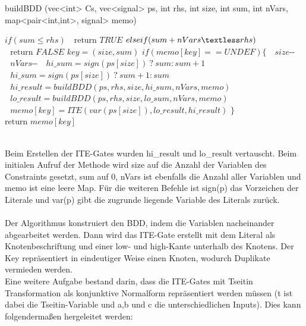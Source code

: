 \documentclass[a4,abstract=on]{scrartcl}
\begin{document}
\begin{algorithm}
\caption{buildBDD (vec<int> Cs, vec<signal> ps, int rhs, int size, int sum, int nVars, map<pair<int,int>, signal> memo)}
\label{alg:buildBDD}
\begin{algorithmic}

\State $\text{}if (sum \leq rhs)$
\State $\text{~~return } TRUE$
\State $\text{}else if (sum + nVars \textless rhs)$
\State $\text{~~return } FALSE$
\State $\text{} key = (size, sum)$
\State $\text{}if (memo[key] == UNDEF) \{$
\State $\text{~~} size\text{-{}-}$
\State $\text{~~} nVars \text{-{}-}$
\State $\text{~~} hi\_sum = sign(ps[size]) {~} ? {~} sum : sum + 1$
\State $\text{~~} hi\_sum = sign(ps[size]) {~} ? {~} sum + 1 : sum$
\State $\text{~~} hi\_result = buildBDD(ps , rhs, size, hi\_sum, nVars, memo)$
\State $\text{~~} lo\_result = buildBDD(ps , rhs, size, lo\_sum, nVars, memo)$
\State $\text{~~} memo[key] = ITE(var(ps[size]), lo\_result, hi\_result)$
\State $\text{} \}$
\State $\text{return }memo[key]$
\end{algorithmic}
\end{algorithm}
\ \\
Beim Erstellen der ITE-Gates wurden hi\_result und lo\_result vertauscht. Beim initialen Aufruf der Methode wird size auf die Anzahl der Variablen des Constraints gesetzt, sum auf $0$, nVars ist ebenfalls die Anzahl aller Variablen und memo ist eine leere Map. Für die weiteren Befehle ist sign(p) das Vorzeichen der Literale und var(p) gibt die zugrunde liegende Variable des Literals zurück.\\
\ \\
Der Algorithmus konstruiert den BDD, indem die Variablen nacheinander abgearbeitet werden. Dann wird das ITE-Gate erstellt mit dem Literal als Knotenbeschriftung und einer low- und high-Kante unterhalb des Knotens. Der Key repräsentiert in eindeutiger Weise einen Knoten, wodurch Duplikate vermieden werden.\\
Eine weitere Aufgabe bestand darin, dass die ITE-Gates mit Tseitin Transformation als konjunktive Normalform repräsentiert werden müssen (t ist dabei die Tseitin-Variable und a,b und c die unterschiedlichen Inputs). Dies kann folgendermaßen hergeleitet werden:\\
\end{document}
